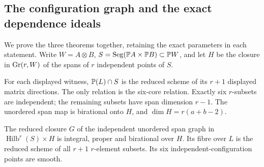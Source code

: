 \subsection{The configuration graph and the exact dependence ideals}
\label{nb:geometry}

We prove the three theorems together, retaining the exact parameters
in each statement. Write $W=A\otimes B$,
$S=\operatorname{Seg}(\mathbb P A\times\mathbb P B)\subset\mathbb P W$, and let $H$ be the closure
in $\operatorname{Gr}(r,W)$ of the spans of $r$ independent points of $S$.

\begin{lemma}\label{nb:configuration}
For each displayed witness, $\mathbb P(L)\cap S$ is the reduced scheme
of its $r+1$ displayed matrix directions. The only relation is the
six-core relation. Exactly six $r$-subsets are independent; the
remaining subsets have span dimension $r-1$. The unordered span map
is birational onto $H$, and $\dim H=r(a+b-2)$.

The reduced closure $G$ of the independent unordered span graph in
$\operatorname{Hilb}^r(S)\times H$ is integral, proper and birational
over $H$. Its fibre over $L$ is the reduced scheme of all $r+1$
$r$-element subsets. Its six independent-configuration points are
smooth.
\end{lemma}

